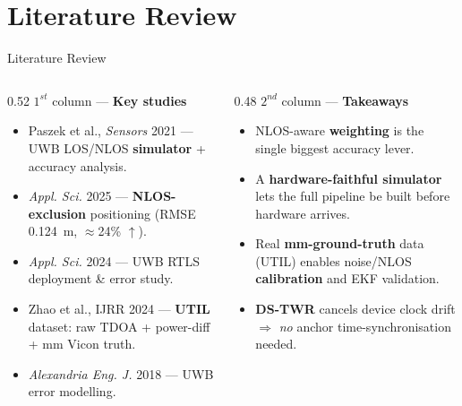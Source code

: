 \documentclass[aspectratio=169,10pt]{beamer}
\begin{document}
\section{Literature Review}
\begin{frame}{Literature Review}
  \begin{columns}[T]
    \begin{column}{0.52\textwidth}
      $1^{st}$ column --- \textbf{Key studies}
      \begin{itemize}\small
        \item Paszek et al., \emph{Sensors} 2021 --- UWB LOS/NLOS \textbf{simulator} + accuracy analysis.
        \item \emph{Appl. Sci.} 2025 --- \textbf{NLOS-exclusion} positioning (RMSE 0.124~m, $\approx$24\% $\uparrow$).
        \item \emph{Appl. Sci.} 2024 --- UWB RTLS deployment \& error study.
        \item Zhao et al., IJRR 2024 --- \textbf{UTIL} dataset: raw TDOA + power-diff + mm Vicon truth.
        \item \emph{Alexandria Eng. J.} 2018 --- UWB error modelling.
      \end{itemize}
    \end{column}
    \begin{column}{0.48\textwidth}
      $2^{nd}$ column --- \textbf{Takeaways}
      \begin{itemize}\small
        \item NLOS-aware \textbf{weighting} is the single biggest accuracy lever.
        \item A \textbf{hardware-faithful simulator} lets the full pipeline be built before hardware arrives.
        \item Real \textbf{mm-ground-truth} data (UTIL) enables noise/NLOS \textbf{calibration} and EKF validation.
        \item \textbf{DS-TWR} cancels device clock drift $\Rightarrow$ \emph{no} anchor time-synchronisation needed.
      \end{itemize}
    \end{column}
  \end{columns}
\end{frame}
\end{document}

